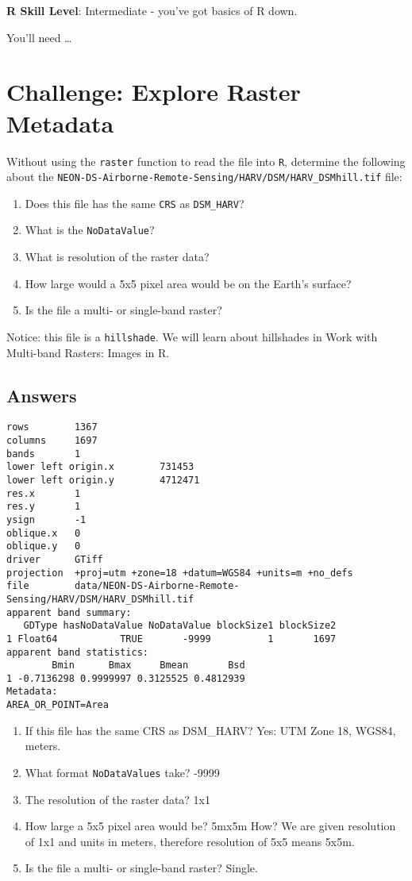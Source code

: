 \documentclass[]{book}
\providecommand{\tightlist}{%
  \setlength{\itemsep}{0pt}\setlength{\parskip}{0pt}}
\theoremstyle{definition}
\theoremstyle{definition}
\theoremstyle{definition}
\theoremstyle{remark}
\begin{document}
\textbf{R Skill Level}: Intermediate - you've got basics of R down.

You'll need \ldots{}

\section{Challenge: Explore Raster
Metadata}\label{challenge-explore-raster-metadata}

Without using the \texttt{raster} function to read the file into
\texttt{R}, determine the following about the
\texttt{NEON-DS-Airborne-Remote-Sensing/HARV/DSM/HARV\_DSMhill.tif}
file:

\begin{enumerate}
\def\labelenumi{\arabic{enumi}.}
\tightlist
\item
  Does this file has the same \texttt{CRS} as \texttt{DSM\_HARV}?
\item
  What is the \texttt{NoDataValue}?
\item
  What is resolution of the raster data?
\item
  How large would a 5x5 pixel area would be on the Earth's surface?
\item
  Is the file a multi- or single-band raster?
\end{enumerate}

Notice: this file is a \texttt{hillshade}. We will learn about
hillshades in Work with Multi-band Rasters: Images in R.

\subsection{Answers}\label{answers}

\begin{verbatim}
rows        1367 
columns     1697 
bands       1 
lower left origin.x        731453 
lower left origin.y        4712471 
res.x       1 
res.y       1 
ysign       -1 
oblique.x   0 
oblique.y   0 
driver      GTiff 
projection  +proj=utm +zone=18 +datum=WGS84 +units=m +no_defs 
file        data/NEON-DS-Airborne-Remote-Sensing/HARV/DSM/HARV_DSMhill.tif 
apparent band summary:
   GDType hasNoDataValue NoDataValue blockSize1 blockSize2
1 Float64           TRUE       -9999          1       1697
apparent band statistics:
        Bmin      Bmax     Bmean       Bsd
1 -0.7136298 0.9999997 0.3125525 0.4812939
Metadata:
AREA_OR_POINT=Area 
\end{verbatim}

\begin{enumerate}
\def\labelenumi{\arabic{enumi}.}
\tightlist
\item
  If this file has the same CRS as DSM\_HARV? Yes: UTM Zone 18, WGS84,
  meters.
\item
  What format \texttt{NoDataValues} take? -9999
\item
  The resolution of the raster data? 1x1
\item
  How large a 5x5 pixel area would be? 5mx5m How? We are given
  resolution of 1x1 and units in meters, therefore resolution of 5x5
  means 5x5m.
\item
  Is the file a multi- or single-band raster? Single.
\end{enumerate}
\end{document}
